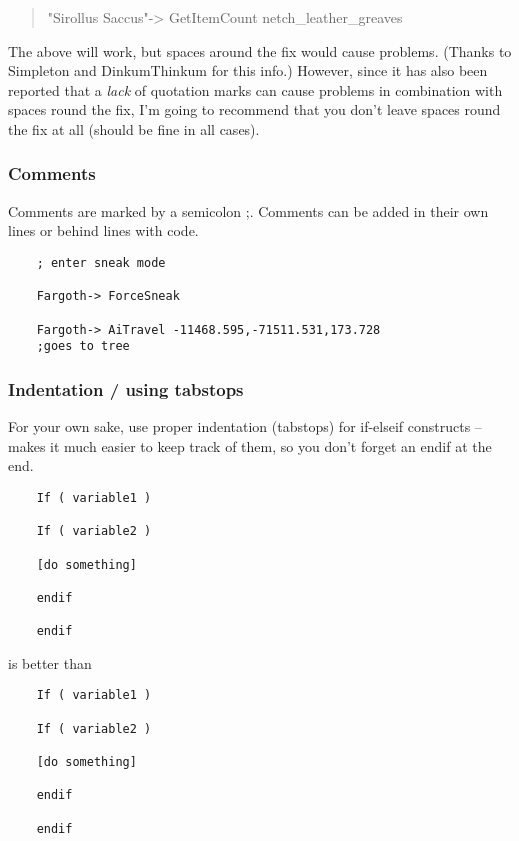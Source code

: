 \begin{quote}
"Sirollus Saccus"-> GetItemCount netch\_leather\_greaves
\end{quote}

The above will work, but spaces around the fix would cause problems.
(Thanks to Simpleton and DinkumThinkum for this info.) However, since it
has also been reported that a \emph{lack} of quotation marks can cause
problems in combination with spaces round the fix, I'm going to
recommend that you don't leave spaces round the fix at all (should be
fine in all cases).

\hypertarget{comments}{%
\subsubsection{Comments}\label{comments}}

Comments are marked by a semicolon ;. Comments can be added in their own
lines or behind lines with code.

\begin{lstlisting}
	; enter sneak mode
	
	Fargoth-> ForceSneak
	
	Fargoth-> AiTravel -11468.595,-71511.531,173.728
	;goes to tree
\end{lstlisting}

\hypertarget{indentation-using-tabstops}{%
\subsubsection{Indentation / using
tabstops}\label{indentation-using-tabstops}}

For your own sake, use proper indentation (tabstops) for if-elseif
constructs -- makes it much easier to keep track of them, so you don't
forget an endif at the end.


\begin{lstlisting}
	If ( variable1 )
	
	If ( variable2 )
	
	[do something]
	
	endif
	
	endif
\end{lstlisting}
	
is better than

\begin{lstlisting}
	If ( variable1 )
	
	If ( variable2 )
	
	[do something]
	
	endif
	
	endif
\end{lstlisting}

